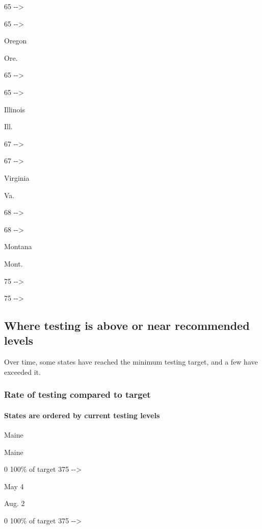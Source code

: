 65 -\/-\textgreater{}

65 -\/-\textgreater{}

Oregon

Ore.

65 -\/-\textgreater{}

65 -\/-\textgreater{}

Illinois

Ill.

67 -\/-\textgreater{}

67 -\/-\textgreater{}

Virginia

Va.

68 -\/-\textgreater{}

68 -\/-\textgreater{}

Montana

Mont.

75 -\/-\textgreater{}

75 -\/-\textgreater{}

\hypertarget{where-testing-is-above-or-near-recommended-levels}{%
\subsection{Where testing is above or near recommended
levels}\label{where-testing-is-above-or-near-recommended-levels}}

Over time, some states have reached the minimum testing target, and a
few have exceeded it.

\hypertarget{rate-of-testing-compared-to-target-1}{%
\subsubsection{Rate of testing compared to
target}\label{rate-of-testing-compared-to-target-1}}

\hypertarget{states-are-ordered-by-current-testing-levels}{%
\paragraph{States are ordered by current testing
levels}\label{states-are-ordered-by-current-testing-levels}}

Maine

Maine

0 100\% of target 375 -\/-\textgreater{}

May 4

Aug. 2

0 100\% of target 375 -\/-\textgreater{}

